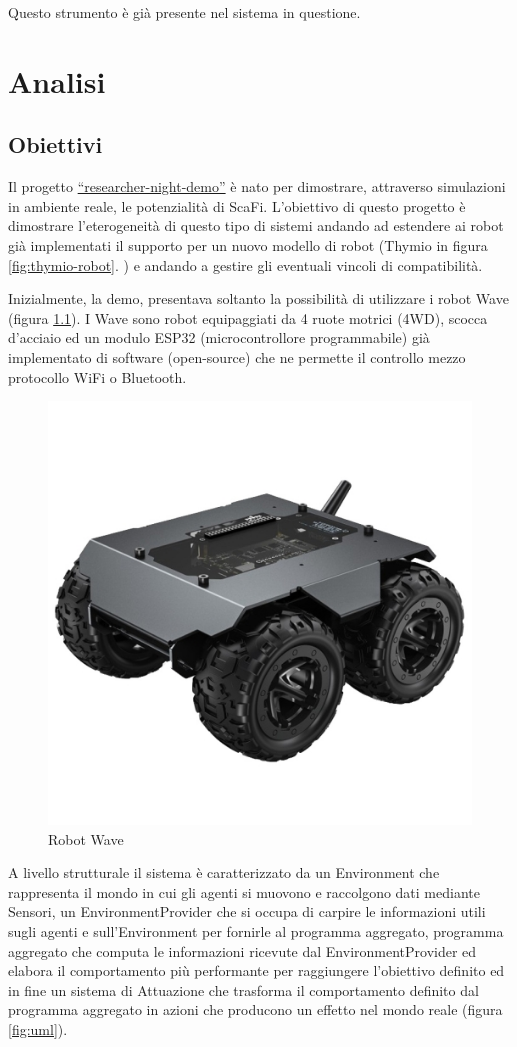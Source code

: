 \documentclass[12pt,a4paper,openright,twoside]{book}
\begin{document}
Questo strumento è già presente nel sistema in questione.

\chapter{Analisi}
\label{chap:analisi}

\section{Obiettivi}
Il progetto \href{https://github.com/cric96/researcher-night-demo.git}{``researcher-night-demo''} è nato per dimostrare, attraverso simulazioni in ambiente reale, le potenzialità di ScaFi. L'obiettivo di questo progetto è dimostrare l'eterogeneità di questo tipo di sistemi andando ad estendere ai robot già implementati il supporto per un nuovo modello di robot (Thymio in figura \ref{fig:thymio-robot}. ) e andando a gestire gli eventuali vincoli di compatibilità.

Inizialmente, la demo, presentava soltanto la possibilità di utilizzare i robot Wave (figura \ref{fig:wave-robot}). I Wave sono robot equipaggiati da 4 ruote motrici (4WD), scocca d'acciaio ed un modulo ESP32 (microcontrollore programmabile) già implementato di software (open-source) che ne permette il controllo mezzo protocollo WiFi o Bluetooth.

\begin{figure}
    \centering
    \includegraphics[width=.3\linewidth]{figures/wave-robot.jpg}
    \caption{Robot Wave}
    \label{fig:wave-robot}
\end{figure}

A livello strutturale il sistema è caratterizzato da un Environment che rappresenta il mondo in cui gli agenti si muovono e raccolgono dati mediante Sensori, un EnvironmentProvider che si occupa di carpire le informazioni utili sugli agenti e sull'Environment per fornirle al programma aggregato, programma aggregato che computa le informazioni ricevute dal EnvironmentProvider ed elabora il comportamento più performante per raggiungere l'obiettivo definito ed in fine un sistema di Attuazione che trasforma il comportamento definito dal programma aggregato in azioni che producono un effetto nel mondo reale (figura \ref{fig:uml}).
\end{document}
